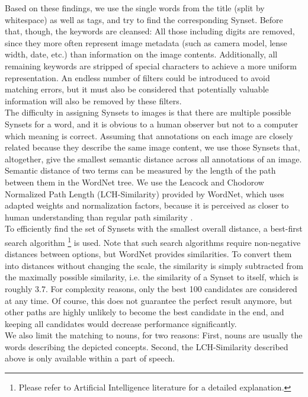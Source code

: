 Based on these findings, we use the single words from the title (split by whitespace) as well as tags, and try to find the corresponding Synset. Before that, though, the keywords are cleansed: All those including digits are removed, since they more often represent image metadata (such as camera model, lense width, date, etc.) than information on the image contents. Additionally, all remaining keywords are stripped of special characters to achieve a more uniform representation. An endless number of filters could be introduced to avoid matching errors, but it must also be considered that potentially valuable information will also be removed by these filters.  \\

The difficulty in assigning Synsets to images is that there are multiple possible Synsets for a word, and it is obvious to a human observer but not to a computer which meaning is correct. Assuming that annotations on each image are closely related because they describe the same image content, we use those Synsets that, altogether, give the smallest semantic distance across all annotations of an image. Semantic distance of two terms can be measured by the length of the path between them in the WordNet tree. We use the Leacock and Chodorow Normalized Path Length (LCH-Similarity) provided by WordNet, which uses adapted weights and normalization factors, because it is perceived as closer to human understanding than regular path similarity \cite{budanitsky01}. \\

To efficiently find the set of Synsets with the smallest overall distance, a best-first search algorithm \footnote{Please refer to Artificial Intelligence literature for a detailed explanation.} is used. Note that such search algorithms require non-negative distances between options, but WordNet provides similarities. To convert them into distances without changing the scale, the similarity is simply subtracted from the maximally possible similarity, i.e. the similarity of a Synset to itself, which is roughly 3.7.
For complexity reasons, only the best 100 candidates are considered at any time. Of course, this does not guarantee the perfect result anymore, but other paths are highly unlikely to become the best candidate in the end, and keeping all candidates would decrease performance significantly. \\
We also limit the matching to nouns, for two reasons: First, nouns are usually the words describing the depicted concepts. Second, the LCH-Similarity described above is only available within a part of speech. 

